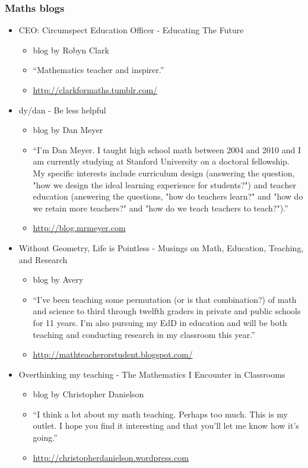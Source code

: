 \subsubsection{Maths blogs}
\begin{itemize}

\item CEO: Circumspect Education Officer - Educating The Future
\begin{itemize} [noitemsep]
 \item blog by Robyn Clark
\item “Mathematics teacher and inspirer.”
\item \url{http://clarkformaths.tumblr.com/ }
\end{itemize}

\item dy/dan - Be less helpful
\begin{itemize} [noitemsep]
\item blog by Dan Meyer
\item “I'm Dan Meyer. I taught high school math between 2004 and 2010 and I am currently studying at Stanford University on a doctoral fellowship. My specific interests include curriculum design (answering the question, "how we design the ideal learning experience for students?") and teacher education (answering the questions, "how do teachers learn?" and "how do we retain more teachers?" and "how do we teach teachers to teach?").”
\item \url{http://blog.mrmeyer.com }
\end{itemize}

\item Without Geometry, Life is Pointless - Musings on Math, Education, Teaching, and Research

\begin{itemize}[noitemsep]
 \item blog by Avery
\item “I've been teaching some permutation (or is that combination?) of math and science to third through twelfth graders in private and public schools for 11 years. I'm also pursuing my EdD in education and will be both teaching and conducting research in my classroom this year.”
\item \url{ http://mathteacherorstudent.blogspot.com/ }
\end{itemize}

\item Overthinking my teaching - The Mathematics I Encounter in Classrooms
\begin{itemize}[noitemsep]
\item blog by Christopher Danielson
\item “I think a lot about my math teaching. Perhaps too much. This is my outlet. I hope you find it interesting and that you’ll let me know how it’s going.”
\item \url{http://christopherdanielson.wordpress.com}
\end{itemize}


\end{itemize}
